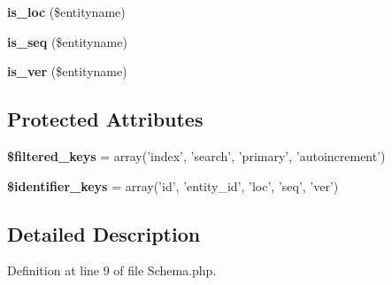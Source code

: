 \begin{DoxyCompactItemize}
\item 
\hypertarget{class_utopia_1_1_components_1_1_model_1_1_schema_aa4d3d997ba5d05e74f04e8c387328f54}{
{\bfseries is\_\-loc} (\$entityname)}
\label{class_utopia_1_1_components_1_1_model_1_1_schema_aa4d3d997ba5d05e74f04e8c387328f54}

\item 
\hypertarget{class_utopia_1_1_components_1_1_model_1_1_schema_a678c81f1aac8cdea900233fc7b5e0416}{
{\bfseries is\_\-seq} (\$entityname)}
\label{class_utopia_1_1_components_1_1_model_1_1_schema_a678c81f1aac8cdea900233fc7b5e0416}

\item 
\hypertarget{class_utopia_1_1_components_1_1_model_1_1_schema_ad3a86e834d8a8f1c8bb92368933a0ca2}{
{\bfseries is\_\-ver} (\$entityname)}
\label{class_utopia_1_1_components_1_1_model_1_1_schema_ad3a86e834d8a8f1c8bb92368933a0ca2}

\end{DoxyCompactItemize}
\subsection*{Protected Attributes}
\begin{DoxyCompactItemize}
\item 
\hypertarget{class_utopia_1_1_components_1_1_model_1_1_schema_a2a658723bdc77a75d8db19ed0a335350}{
{\bfseries \$filtered\_\-keys} = array('index', 'search', 'primary', 'autoincrement')}
\label{class_utopia_1_1_components_1_1_model_1_1_schema_a2a658723bdc77a75d8db19ed0a335350}

\item 
\hypertarget{class_utopia_1_1_components_1_1_model_1_1_schema_a34ff9854d1b479762015d53897f56f04}{
{\bfseries \$identifier\_\-keys} = array('id', 'entity\_\-id', 'loc', 'seq', 'ver')}
\label{class_utopia_1_1_components_1_1_model_1_1_schema_a34ff9854d1b479762015d53897f56f04}

\end{DoxyCompactItemize}


\subsection{Detailed Description}


Definition at line 9 of file Schema.php.



